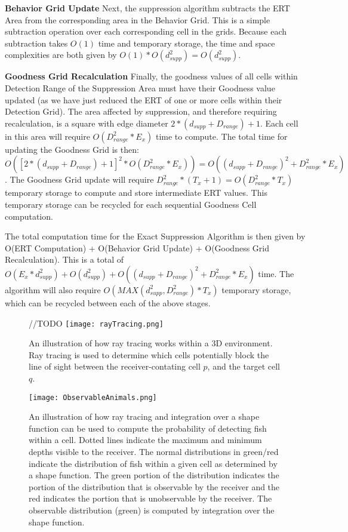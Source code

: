 \textbf{Behavior Grid Update}\newline
Next, the suppression algorithm subtracts the ERT Area from the corresponding area in the Behavior Grid.  This is a simple subtraction operation over each corresponding cell in the grids.  Because each subtraction takes $O(1)$ time and temporary storage, the time and space complexities are both given by $O(1) * O(d_{supp}^2) = O(d_{supp}^2)$.

\textbf{Goodness Grid Recalculation}\newline
Finally, the goodness values of all cells within Detection Range of the Suppression Area must have their Goodness value updated (as we have just reduced the ERT of one or more cells within their Detection Grid).  The area affected by suppression, and therefore requiring recalculation, is a square with edge diameter $2 * (d_{supp} + D_{range}) + 1$.  Each cell in this area will require  $O(D_{range}^2 * E_x)$ time to compute.  The total time for updating the Goodness Grid is then: $O([2 * (d_{supp} + D_{range}) + 1]^2 * O(D_{range}^2 * E_x)) = O((d_{supp} + D_{range})^2 + D_{range}^2 * E_x)$.  The Goodness Grid update will require $D_{range}^2 * (T_x + 1) = O(D_{range}^2 * T_x)$ temporary storage to compute and store intermediate ERT values.  This temporary storage can be recycled for each sequential Goodness Cell computation.


The total computation time for the Exact Suppression Algorithm is then given by O(ERT Computation) + O(Behavior Grid Update) + O(Goodness Grid Recalculation). This is a total of $O(E_{x} * d_{supp}^2) + O(d_{supp}^2) + O((d_{supp} + D_{range})^2 + D_{range}^2 * E_x)$ time.  The algorithm will also require $O(MAX(d_{supp}^2 , D_{range}^2) * T_x)$ temporary storage, which can be recycled between each of the above stages.




\begin{figure}[t] //TODO
	\label{rayTracing}
	\centering
	\texttt{[image: rayTracing.png]}
	\caption{An illustration of how ray tracing works within a 3D environment.  Ray tracing is used to determine which cells potentially block the line of sight between the receiver-contating cell $p$, and the target cell $q$.   \cite{Akbarzadeh2013}}
\end{figure}

\begin{figure}[t]
	\label{observableAnimals}
	\centering
	\texttt{[image: ObservableAnimals.png]}
	\caption{An illustration of how ray tracing and integration over a shape function can be used to compute the probability of detecting fish within a cell.  Dotted lines indicate the maximum and minimum depths visible to the receiver.  The normal distributions in green/red indicate the distribution of fish within a given cell as determined by a shape function.  The green portion of the distribution indicates the portion of the distribution that is observable by the receiver and the red indicates the portion that is unobservable by the receiver.  The observable distribution (green) is computed by integration over the shape function.}
\end{figure}